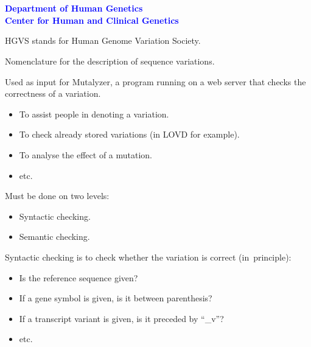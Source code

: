 \documentclass[a4, portrait]{seminar}
\providecommand{\mspace}{\vspace{0.5cm}}
\begin{document}

\begin{slide}
\setcounter{slide}{0}
\vspace*{1.5cm}
\begin{center}
{\bf\Large{\myTitle}}\\
\vspace{2.5cm}
\textcolor{Blue}{
  {\bf
    \small{\me}\\
    \small{Department of Human Genetics}\\
    \small{Center for Human and Clinical Genetics}
  }
}
\end{center}
\vfill
\end{slide}



\begin{slide}

HGVS stands for Human Genome Variation Society. 
\mspace

Nomenclature for the description of sequence variations.
\mspace

Used as input for Mutalyzer, a program running on a web server that checks
the correctness of a variation.

\begin{itemize}
\item To assist people in denoting a variation.
\item To check already stored variations (in LOVD for example).
\item To analyse the effect of a mutation.
\item etc.
\end{itemize}
\vfill
\end{slide}

\begin{slide}

Must be done on two levels:

\begin{itemize}
\item Syntactic checking.
\item Semantic checking.
\end{itemize}
\mspace

Syntactic checking is to check whether the variation is correct (in~principle):
\begin{itemize}
\item Is the reference sequence given?
\item If a gene symbol is given, is it between parenthesis?
\item If a transcript variant is given, is it preceded by ``\_v''?
\item etc.
\end{itemize}
\vfill
\end{slide}
\end{document}

